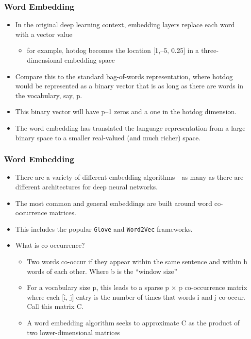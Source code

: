 \documentclass[
  shownotes,
  xcolor={svgnames},
  hyperref={colorlinks,citecolor=DarkBlue,linkcolor=DarkRed,urlcolor=DarkBlue}
  , aspectratio=169]{beamer}
\begin{document}
\begin{frame}
\frametitle{Word Embedding }

\begin{itemize}
  \item In the original deep learning context, embedding layers replace each word with a vector value
  \begin{itemize}
    \item for example, hotdog becomes the location [1,–5, 0.25] in a three-dimensional embedding space%
   \end{itemize} 
  \item Compare this to the standard bag-of-words representation, where hotdog would be represented as a binary vector that is as long as there are words in the vocabulary, say, p. 
  \medskip
  \item This binary vector will have p–1 zeros and a one in the hotdog dimension. 
  \medskip
  \item The word embedding has translated the language representation from a large binary space to a smaller real-valued (and much richer) space. 
\end{itemize}


\end{frame}
\begin{frame}
\frametitle{Word Embedding }

\begin{itemize}
\item There are a variety of different embedding algorithms—as many as there are different architectures for deep neural networks. 
\medskip
\item The most common and general embeddings are built around word co-occurrence matrices. 
\medskip
\item This includes the popular \texttt{Glove} and \texttt{Word2Vec} frameworks. 
\medskip
\item What is co-occurrence?
  \begin{itemize}
  \item  Two words co-occur if they appear within the same sentence and within b words of each other. Where b is the “window size”
  \item  For a vocabulary size p, this leads to a sparse p × p co-occurrence matrix where each [i, j] entry is the number of times that words i and j co-occur. Call this matrix C. 
  \item A word embedding algorithm seeks to approximate C as the product of two lower-dimensional matrices
  \end{itemize}
\end{itemize}
 
\end{frame}
\end{document}
